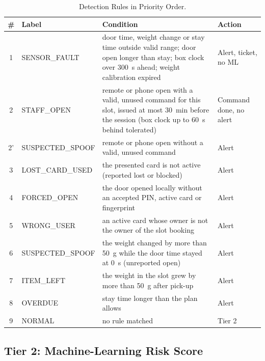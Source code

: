 \documentclass[journal,onecolumn]{IEEEtran}
\begin{document}
\begin{table}[!htbp]
\renewcommand{\arraystretch}{1.18}
\centering
\small
\caption{Detection Rules in Priority Order.}
\label{tab:rules}
\vspace{5pt}
\begin{tabular}{c l p{8.6cm} l}
\hline
\# & Label & Condition & Action \\
\hline
\rule{0pt}{2.6ex}1 & SENSOR\_FAULT & door time, weight change or stay time outside valid range; door open longer than stay; box clock over 300~s ahead; weight calibration expired & Alert, ticket, no ML \\[2pt]
2 & STAFF\_OPEN & remote or phone open with a valid, unused command for this slot, issued at most 30~min before the session (box clock up to 60~s behind tolerated) & Command done, no alert \\[2pt]
2' & SUSPECTED\_SPOOF & remote or phone open without a valid, unused command & Alert \\[2pt]
3 & LOST\_CARD\_USED & the presented card is not active (reported lost or blocked) & Alert \\[2pt]
4 & FORCED\_OPEN & the door opened locally without an accepted PIN, active card or fingerprint & Alert \\[2pt]
5 & WRONG\_USER & an active card whose owner is not the owner of the slot booking & Alert \\[2pt]
6 & SUSPECTED\_SPOOF & the weight changed by more than 50~g while the door time stayed at 0~s (unreported open) & Alert \\[2pt]
7 & ITEM\_LEFT & the weight in the slot grew by more than 50~g after pick-up & Alert \\[2pt]
8 & OVERDUE & stay time longer than the plan allows & Alert \\[2pt]
9 & NORMAL & no rule matched & Tier 2 \\
\hline
\end{tabular}
\end{table}

\subsection{Tier 2: Machine-Learning Risk Score}
\end{document}
